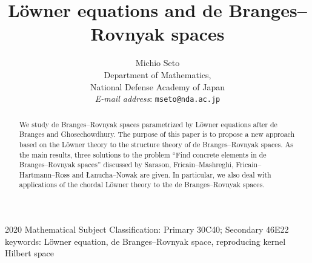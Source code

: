 \documentclass[12pt]{article}
\numberwithin{equation}{section}
\begin{document}
\title{L\"{o}wner equations and de Branges--Rovnyak spaces}
\author{Michio Seto\\
Department of Mathematics, \\
National Defense Academy of Japan\\
{\small 
{\it E-mail address}: {\tt mseto@nda.ac.jp}}\\
} 
\maketitle

\begin{abstract} 
We study de Branges--Rovnyak spaces parametrized by L\"{o}wner equations 
after de Branges and Ghosechowdhury.  
The purpose of this paper is to propose a new approach based on the L\"{o}wner theory 
to the structure theory of de Branges--Rovnyak spaces. 
As the main results, three solutions to the problem ``Find concrete elements in de Branges--Rovnyak spaces'' discussed by 
Sarason, Fricain--Mashreghi, Fricain--Hartmann--Ross and {\L}anucha--Nowak are given. 
In particular, we also deal with applications of the chordal  L\"{o}wner theory to the de Branges--Rovnyak spaces. 
\end{abstract}

\begin{center}
2020 Mathematical Subject Classification: Primary 30C40; Secondary 46E22\\
keywords: L\"{o}wner equation, de Branges--Rovnyak space, reproducing kernel Hilbert space
\end{center}
\end{document}
